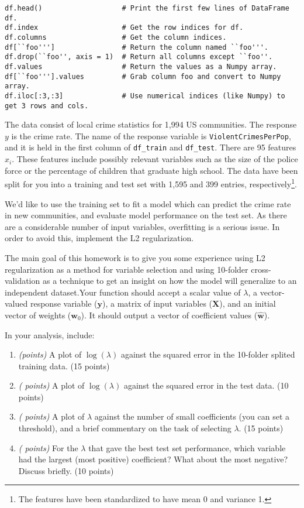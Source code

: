 \documentclass{article}
\begin{document}
\begin{verbatim}
df.head()                   # Print the first few lines of DataFrame df.
df.index                    # Get the row indices for df.
df.columns                  # Get the column indices.
df[``foo''']                # Return the column named ``foo'''.
df.drop(``foo'', axis = 1)  # Return all columns except ``foo''.
df.values                   # Return the values as a Numpy array.
df[``foo'''].values         # Grab column foo and convert to Numpy array.
df.iloc[:3,:3]              # Use numerical indices (like Numpy) to get 3 rows and cols.
\end{verbatim}

The data consist of local crime statistics for 1,994 US communities. The response $y$ is the crime rate. The name of the response variable is \texttt{ViolentCrimesPerPop}, and it is held in the first column of \texttt{df\_train} and \texttt{df\_test}. There are 95 features $x_i$. These features include possibly relevant variables such as the size of the police force or the percentage of children that graduate high school. The data have been split for you into a training and test set with 1,595 and 399 entries, respectively\footnote{The features have been standardized to have mean 0 and variance 1.}.

We'd like to use the training set to fit a model which can predict the crime rate in new communities, and evaluate model performance on the test set. As there are a considerable number of input variables, overfitting is a serious issue. In order to avoid this, implement the L2 regularization. 


The main goal of this homework is to give you some experience using L2 regularization as a method for variable selection and using 10-folder cross-validation as a technique to get an insight on how the model will generalize to an independent dataset.Your function should accept a scalar value of $\lambda$, a vector-valued response variable ($\mathbf{y}$), a matrix of input variables ($\mathbf{X}$), and an initial vector of weights ($\mathbf{w}_0$). It should output a vector of coefficient values ($\hat{\mathbf{w}}$).

In your analysis, include:
\begin{enumerate}[(1)]


\item \emph{ (points)} A plot of $\log(\lambda)$ against the squared error in the 10-folder splited training data. (15 points)
\item \emph{( points)} A plot of $\log(\lambda)$ against the squared error in the test data. (10 points)
\item \emph{( points)} A plot of $\lambda$ against the number of small coefficients (you can set a threshold), and a brief commentary on the task of selecting $\lambda$. (15 points)
\item \emph{( points)} For the $\lambda$ that gave the best test set performance, which variable had the largest (most positive) coefficient? What about the most negative? Discuss briefly.  (10 points)
\end{enumerate}
\end{document}
